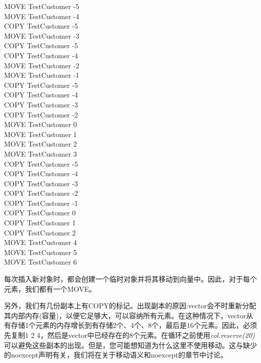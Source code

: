 \begin{tcolorbox}[colback=white,colframe=black]
MOVE TestCustomer -5 \\
MOVE TestCustomer -4 \\
COPY TestCustomer -5 \\
MOVE TestCustomer -3 \\
COPY TestCustomer -5 \\
COPY TestCustomer -4 \\
MOVE TestCustomer -2 \\
MOVE TestCustomer -1 \\
COPY TestCustomer -5 \\
COPY TestCustomer -4 \\
COPY TestCustomer -3 \\
COPY TestCustomer -2 \\
MOVE TestCustomer 0 \\
MOVE TestCustomer 1 \\
MOVE TestCustomer 2 \\
MOVE TestCustomer 3 \\
COPY TestCustomer -5 \\
COPY TestCustomer -4 \\
COPY TestCustomer -3 \\
COPY TestCustomer -2 \\
COPY TestCustomer -1 \\
COPY TestCustomer 0 \\
COPY TestCustomer 1 \\
COPY TestCustomer 2 \\
MOVE TestCustomer 4 \\
MOVE TestCustomer 5 \\
MOVE TestCustomer 6 \\
\end{tcolorbox}

每次插入新对象时，都会创建一个临时对象并将其移动到向量中。因此，对于每个元素，我们都有一个MOVE。\par

另外，我们有几份副本上有COPY的标记。出现副本的原因:vector会不时重新分配其内部内存(容量)，以便它足够大，可以容纳所有元素。在这种情况下，vector从有存储1个元素的内存增长到有存储2个、4个、8个，最后是16个元素。因此，必须先复制1 2 4，然后是vector中已经存在的8个元素。在循环之前使用\textit{col.reserve(20)}可以避免这些副本的出现。但是，您可能想知道为什么这里不使用移动。这与缺少的noexcept声明有关，我们将在关于移动语义和noexcept的章节中讨论。\par

